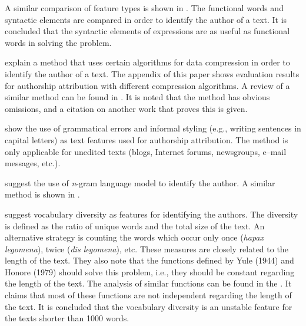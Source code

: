 \documentclass[11pt,english]{article}
\begin{document}
\begin{multicols}{2}
A similar comparison of feature types is shown in
\citep{uzuner2005comparative}. The functional words and syntactic
elements are compared in order to identify the author of a text. It is
concluded that the syntactic elements of expressions are as useful as functional 
words in solving the problem.

\citet{kukushkina2001using} explain a method that uses certain algorithms for data
compression in order to identify the author of a text. The appendix of this paper shows evaluation results
for authorship attribution with different compression algorithms.
A review of a similar method can be found in 
\citep{zhao2005effective}. It is noted that the method has obvious omissions, 
and a citation on another work that proves this is given.

\citet{koppel2003exploiting} show the use of grammatical errors and informal
styling (e.g., writing sentences in capital letters) as text features used for authorship attribution.
The method is only applicable for unedited texts (blogs, Internet forums,
newsgroups, e--mail messages, etc.).

\citet{peng2003language} suggest the use of \emph{n}-gram language model to identify
the author. A similar method is shown in \citep{coyotl2006authorship}.

\citet{stamatatos2001computer} suggest vocabulary diversity as
features for identifying the authors. The diversity is defined as the ratio of unique words 
and the total size of the text. An alternative strategy is counting the words which occur only once
(\emph{hapax legomena}), twice (\emph{dis legomena}), etc.
These measures are closely related to the length of the text. They also note that
the functions defined by Yule (1944) and Honore (1979) should solve this problem,
i.e., they should be constant regarding the length of the text. The analysis of
similar functions can be found in the \citep{tweedie1998variable}. It claims
that most of these functions are not independent regarding the length of the
text. It is concluded that the vocabulary diversity is an unstable feature for
the texts shorter than 1000 words.


\end{multicols}
\end{document}
